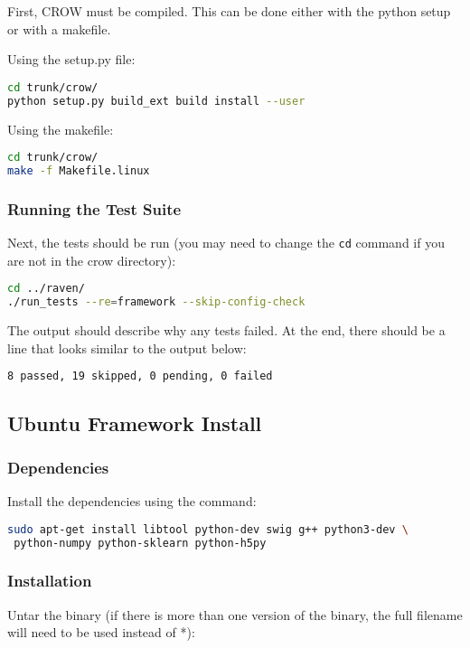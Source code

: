 First, CROW must be compiled. This can be done either with the python setup or
with a makefile.

Using the setup.py file:
\begin{lstlisting}[language=bash]
cd trunk/crow/
python setup.py build_ext build install --user
\end{lstlisting}

Using the makefile:
\begin{lstlisting}[language=bash]
cd trunk/crow/
make -f Makefile.linux
\end{lstlisting}

\subsubsection{Running the Test Suite}

Next, the tests should be run (you may need to change the \texttt{cd}
command if you are not in the crow directory):

\begin{lstlisting}[language=bash]
cd ../raven/
./run_tests --re=framework --skip-config-check
\end{lstlisting}

The output should describe why any tests failed.
%
At the end, there should be a line that looks similar to the output below:
\begin{lstlisting}[language=bash]
8 passed, 19 skipped, 0 pending, 0 failed
\end{lstlisting}

\subsection{Ubuntu Framework Install}

\subsubsection{Dependencies}
Install the dependencies using the command:

\begin{lstlisting}[language=bash]
sudo apt-get install libtool python-dev swig g++ python3-dev \
 python-numpy python-sklearn python-h5py
\end{lstlisting}

\subsubsection{Installation}
Untar the binary (if there is more than one version of the
binary, the full filename will need to be used instead of *):

